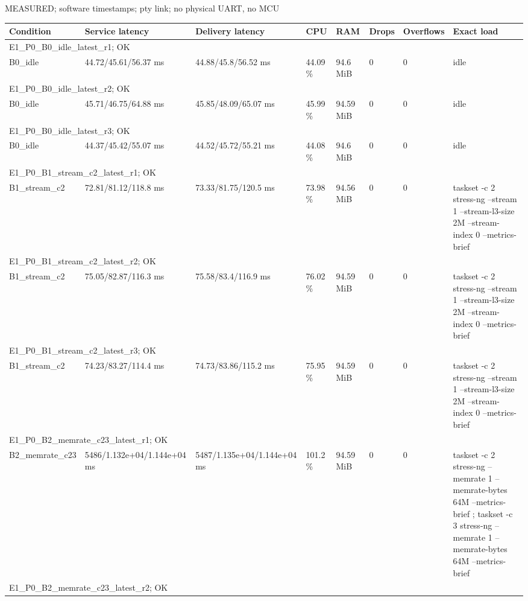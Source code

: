 \par\noindent MEASURED; software timestamps; pty link; no physical UART, no MCU\par
\begin{tabular}{llllllll}
\toprule
Condition & Service latency & Delivery latency & CPU & RAM & Drops & Overflows & Exact load \\
\midrule
\multicolumn{8}{l}{E1\_P0\_B0\_idle\_latest\_r1; OK} \\
B0\_idle & 44.72/45.61/56.37 ms & 44.88/45.8/56.52 ms & 44.09 \% & 94.6 MiB & 0 & 0 & idle \\
\multicolumn{8}{l}{E1\_P0\_B0\_idle\_latest\_r2; OK} \\
B0\_idle & 45.71/46.75/64.88 ms & 45.85/48.09/65.07 ms & 45.99 \% & 94.59 MiB & 0 & 0 & idle \\
\multicolumn{8}{l}{E1\_P0\_B0\_idle\_latest\_r3; OK} \\
B0\_idle & 44.37/45.42/55.07 ms & 44.52/45.72/55.21 ms & 44.08 \% & 94.6 MiB & 0 & 0 & idle \\
\multicolumn{8}{l}{E1\_P0\_B1\_stream\_c2\_latest\_r1; OK} \\
B1\_stream\_c2 & 72.81/81.12/118.8 ms & 73.33/81.75/120.5 ms & 73.98 \% & 94.56 MiB & 0 & 0 & taskset -c 2 stress-ng --stream 1 --stream-l3-size 2M --stream-index 0 --metrics-brief \\
\multicolumn{8}{l}{E1\_P0\_B1\_stream\_c2\_latest\_r2; OK} \\
B1\_stream\_c2 & 75.05/82.87/116.3 ms & 75.58/83.4/116.9 ms & 76.02 \% & 94.59 MiB & 0 & 0 & taskset -c 2 stress-ng --stream 1 --stream-l3-size 2M --stream-index 0 --metrics-brief \\
\multicolumn{8}{l}{E1\_P0\_B1\_stream\_c2\_latest\_r3; OK} \\
B1\_stream\_c2 & 74.23/83.27/114.4 ms & 74.73/83.86/115.2 ms & 75.95 \% & 94.59 MiB & 0 & 0 & taskset -c 2 stress-ng --stream 1 --stream-l3-size 2M --stream-index 0 --metrics-brief \\
\multicolumn{8}{l}{E1\_P0\_B2\_memrate\_c23\_latest\_r1; OK} \\
B2\_memrate\_c23 & 5486/1.132e+04/1.144e+04 ms & 5487/1.135e+04/1.144e+04 ms & 101.2 \% & 94.59 MiB & 0 & 0 & taskset -c 2 stress-ng --memrate 1 --memrate-bytes 64M --metrics-brief ; taskset -c 3 stress-ng --memrate 1 --memrate-bytes 64M --metrics-brief \\
\multicolumn{8}{l}{E1\_P0\_B2\_memrate\_c23\_latest\_r2; OK} \\

\end{tabular}
